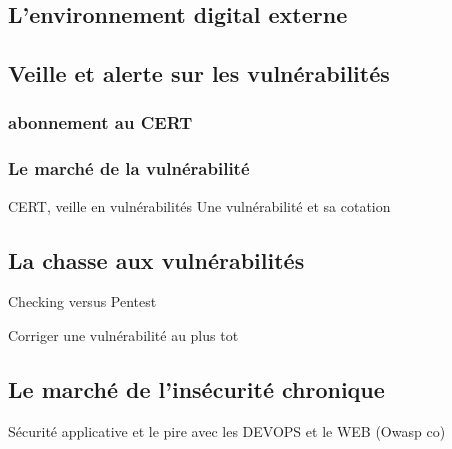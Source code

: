 \subsection{L’environnement digital externe}

\subsection{Veille et alerte sur les vulnérabilités}

	\subsubsection{abonnement au CERT}


	\subsubsection{Le marché de la vulnérabilité}

	CERT,  veille en vulnérabilités
	Une vulnérabilité et sa cotation

\subsection{La chasse aux vulnérabilités}
	Checking versus Pentest


Corriger une vulnérabilité au plus tot
\subsection{Le marché de l’insécurité chronique}
	Sécurité applicative
	et le pire avec les DEVOPS et le WEB (Owasp co)


 

